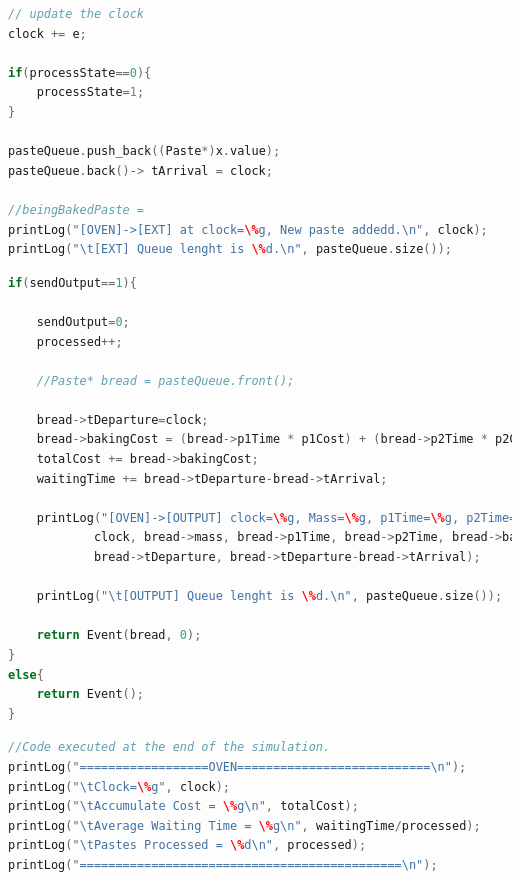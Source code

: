\documentclass[titlepage]{report}%
\newcommand{\oven}{\texttt{Oven}~}
\newcommand{\extt}{\texttt{External Transition}~}
\newcommand{\out}{\texttt{Output}~}
\begin{document}
{\begin{lstlisting}[caption={\extt function for \oven}, language=c++, label={o_ext}]
// update the clock
clock += e;

if(processState==0){
	processState=1;	
}

pasteQueue.push_back((Paste*)x.value);
pasteQueue.back()-> tArrival = clock;

//beingBakedPaste = 
printLog("[OVEN]->[EXT] at clock=\%g, New paste addedd.\n", clock);
printLog("\t[EXT] Queue lenght is \%d.\n", pasteQueue.size());
\end{lstlisting}


\begin{lstlisting}[caption={\out function for \oven}, language=c++, label={o_output}]
if(sendOutput==1){

	sendOutput=0;
	processed++;

	//Paste* bread = pasteQueue.front();

	bread->tDeparture=clock;
	bread->bakingCost = (bread->p1Time * p1Cost) + (bread->p2Time * p2Cost);
	totalCost += bread->bakingCost;
	waitingTime += bread->tDeparture-bread->tArrival;

	printLog("[OVEN]->[OUTPUT] clock=\%g, Mass=\%g, p1Time=\%g, p2Time=\%g, Cost=\%g, Accumulated Cost=\%g, tArrival=\%g, tDepart=\%g, tWait=\%g\n", 
			clock, bread->mass, bread->p1Time, bread->p2Time, bread->bakingCost,totalCost, bread->tArrival, 
			bread->tDeparture, bread->tDeparture-bread->tArrival);

	printLog("\t[OUTPUT] Queue lenght is \%d.\n", pasteQueue.size());	
	
	return Event(bread, 0);
}
else{
	return Event();
}
\end{lstlisting}

\begin{lstlisting}[caption={Exit function for \oven}, language=c++, label={o_exit}]
//Code executed at the end of the simulation.
printLog("==================OVEN===========================\n");
printLog("\tClock=\%g", clock);
printLog("\tAccumulate Cost = \%g\n", totalCost);
printLog("\tAverage Waiting Time = \%g\n", waitingTime/processed);
printLog("\tPastes Processed = \%d\n", processed);
printLog("=============================================\n");
\end{lstlisting}



}
\end{document}
